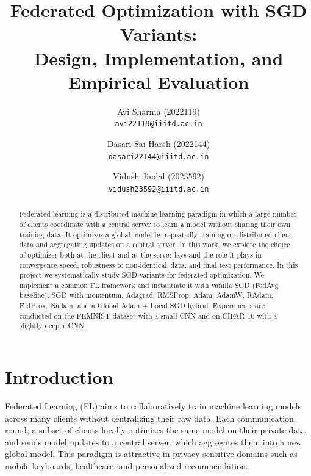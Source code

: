 \documentclass[10pt,twocolumn,letterpaper]{article}
\begin{document}
    \title{Federated Optimization with SGD Variants:\\
    Design, Implementation, and Empirical Evaluation}

    \author{
    Avi Sharma (2022119)\\
    {\tt\small avi22119@iiitd.ac.in}
    \and
    Dasari Sai Harsh (2022144)\\
    {\tt\small dasari22144@iiitd.ac.in}
    \and
    Vidush Jindal (2023592)\\
    {\tt\small vidush23592@iiitd.ac.in}
    }
    \maketitle


    \begin{abstract}
    Federated learning is a distributed machine learning paradigm in which a large number of clients coordinate with a central server to learn a model without sharing their own training data. It optimizes a global model by repeatedly training on distributed client data and aggregating updates on a central server. In this work, we explore the choice of optimizer both at the client and at the server lays and the role it plays in convergence speed, robustness to non-identical\ data, and final test performance.
    In this project we systematically study SGD variants for federated
    optimization. 
    We implement a common FL framework and instantiate it with vanilla
    SGD (FedAvg baseline), SGD with momentum, Adagrad, RMSProp, Adam, AdamW,
    RAdam, FedProx, Nadam, and a Global Adam + Local SGD hybrid.
    Experiments are conducted on the FEMNIST dataset with a small CNN and on
    CIFAR-10 with a slightly deeper CNN.
    \end{abstract}

    \section{Introduction}
    \label{sec:intro}

    Federated Learning (FL) aims to collaboratively train machine learning
    models across many clients without centralizing their raw data.
    Each communication round, a subset of clients locally optimizes the same
    model on their private data and sends model updates to a central server,
    which aggregates them into a new global model.
    This paradigm is attractive in privacy-sensitive domains such as
    mobile keyboards, healthcare, and personalized recommendation.
\end{document}
